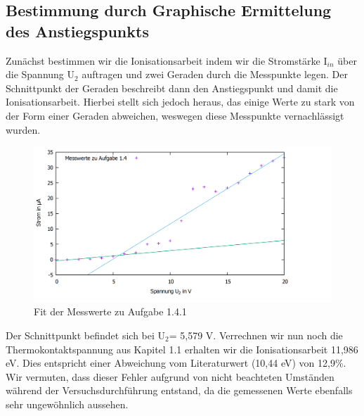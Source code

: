 \subsection{Bestimmung durch Graphische Ermittelung des Anstiegspunkts}
Zunächst bestimmen wir die Ionisationsarbeit indem wir die Stromstärke I$ _{in} $ über die Spannung U$ _2 $ auftragen und zwei Geraden durch die Messpunkte legen. Der Schnittpunkt der Geraden beschreibt dann den Anstiegspunkt und damit die Ionisationsarbeit. Hierbei stellt sich jedoch heraus, das einige Werte zu stark von der Form einer Geraden abweichen, weswegen diese Messpunkte vernachlässigt wurden. 
\begin{figure}
	\includegraphics[width=\textwidth]{../Daten/Aufgabe1/Aufgabe1_4.png}
	\caption{Fit der Messwerte zu Aufgabe 1.4.1}
\end{figure}

Der Schnittpunkt befindet sich bei U$ _2 $= 5,579 V. Verrechnen wir nun noch die Thermokontaktspannung aus Kapitel 1.1 erhalten wir die Ionisationsarbeit 11,986 eV. Dies entspricht einer Abweichung vom Literaturwert (10,44 eV) von 12,9\%. Wir vermuten, dass dieser Fehler aufgrund von nicht beachteten Umständen während der Versuchsdurchführung entstand, da die gemessenen Werte ebenfalls sehr ungewöhnlich aussehen.
